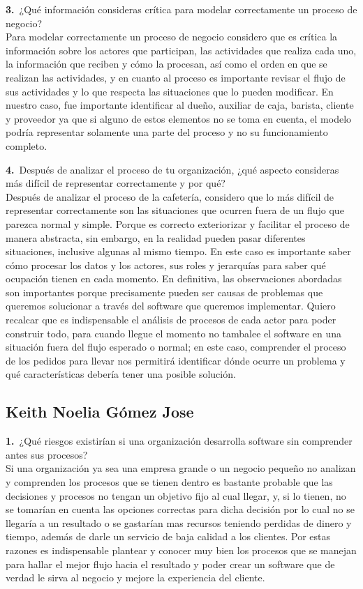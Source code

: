 \documentclass[12pt,letterpaper]{article}
\newcommand{\negr}[1]{\textsf{\bfseries\color{verde} #1}}
\begin{document}
\vspace{0.4cm}
\noindent\negr{3.}\ ¿Qué información consideras crítica para modelar correctamente un proceso de negocio?\\
Para modelar correctamente un proceso de negocio considero que es crítica la información sobre los actores que participan, las actividades que realiza cada uno, la información que reciben y cómo la procesan, así como el orden en que se realizan las actividades, y en cuanto al proceso es importante revisar el flujo de sus actividades y lo que respecta las situaciones que lo pueden modificar. En nuestro caso, fue importante identificar al dueño, auxiliar de caja, barista, cliente y proveedor ya que si alguno de estos elementos no se toma en cuenta, el modelo podría representar solamente una parte del proceso y no su funcionamiento completo.

\vspace{0.4cm}
\noindent\negr{4.}\ Después de analizar el proceso de tu organización, ¿qué aspecto consideras más difícil de representar correctamente y por qué?\\
Después de analizar el proceso de la cafetería, considero que lo más difícil de representar correctamente son las situaciones que ocurren fuera de un flujo que parezca normal y simple. Porque es correcto exteriorizar y facilitar el proceso de manera abstracta, sin embargo, en la realidad pueden pasar diferentes situaciones, inclusive algunas al mismo tiempo. En este caso es importante saber cómo procesar los datos y los actores, sus roles y jerarquías para saber qué ocupación tienen en cada momento. En definitiva, las observaciones abordadas son importantes porque precisamente pueden ser causas de problemas que queremos solucionar a través del software que queremos implementar. Quiero recalcar que es indispensable el análisis de procesos de cada actor para poder construir todo, para cuando llegue el momento no tambalee el software en una situación fuera del flujo esperado o normal; en este caso, comprender el proceso de los pedidos para llevar nos permitirá identificar dónde ocurre un problema y qué características debería tener una posible solución.

\clearpage
\subsection{Keith Noelia Gómez Jose}
\noindent\negr{1.}\ ¿Qué riesgos existirían si una organización desarrolla software sin comprender antes sus procesos?\\
Si una organización ya sea una empresa grande o un negocio pequeño no analizan y comprenden los procesos que se tienen dentro es bastante probable que las decisiones y procesos no tengan un objetivo fijo al cual llegar, y, si lo tienen, no se tomarían en cuenta las opciones correctas para dicha decisión por lo cual no se llegaría a un resultado o se gastarían mas recursos teniendo perdidas de dinero y tiempo, además de darle un servicio de baja calidad a los clientes. Por estas razones es indispensable plantear y conocer muy bien los procesos que se manejan para hallar el mejor flujo hacia el resultado y poder crear un software que de verdad le sirva al negocio y mejore la experiencia del cliente.
\end{document}

